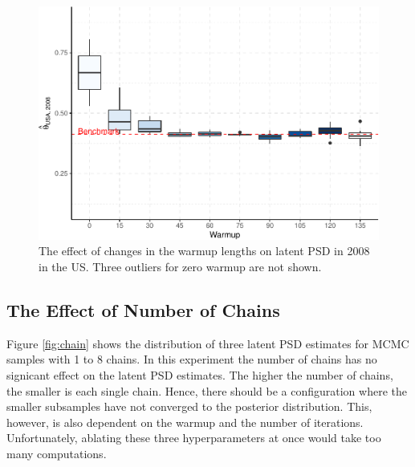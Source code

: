 \documentclass[12pt,english,a4paper,oneside]{article}
\theoremstyle{definition}
\theoremstyle{definition}
\theoremstyle{definition}
\theoremstyle{definition}
\theoremstyle{remark}
\begin{document}
\begin{figure}[H]
\includegraphics[width=\textwidth]{figs/warmup-1} \caption[The effect of changes in the warmup lengths on latent PSD in 2008 in the US]{The effect of changes in the warmup lengths on latent PSD in 2008 in the US. Three outliers for zero warmup are not shown.}\label{fig:warmup}
\end{figure}

\hypertarget{the-effect-of-number-of-chains}{%
\subsection{The Effect of Number of Chains}\label{the-effect-of-number-of-chains}}

Figure \ref{fig:chain} shows the distribution of three latent PSD estimates for MCMC samples with 1 to 8 chains. In this experiment the number of chains has no signicant effect on the latent PSD estimates. The higher the number of chains, the smaller is each single chain. Hence, there should be a configuration where the smaller subsamples have not converged to the posterior distribution. This, however, is also dependent on the warmup and the number of iterations. Unfortunately, ablating these three hyperparameters at once would take too many computations.
\end{document}
